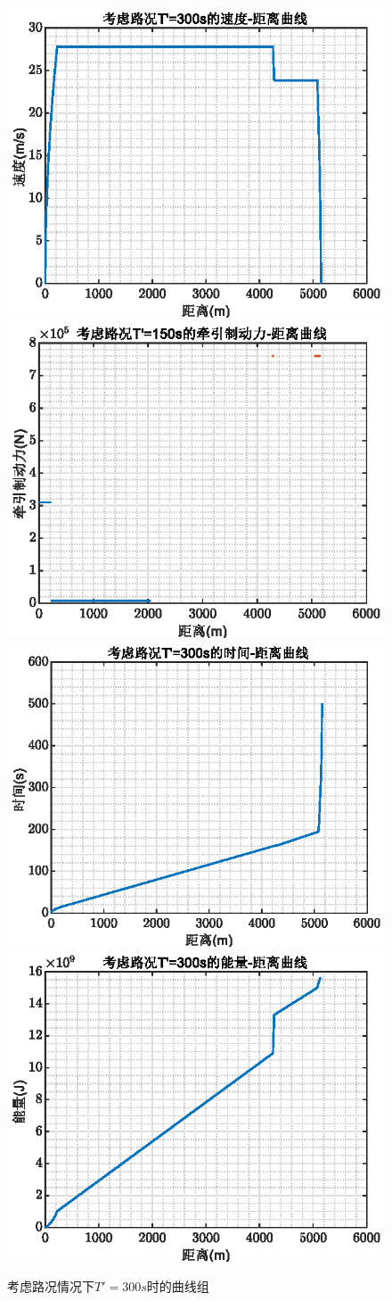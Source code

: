 \documentclass[12pt,a4paper]{nmmcm}
\begin{document}
\begin{figure}[H]
\centering
\includegraphics[width=.49\textwidth,height=0.3\textwidth]{figures/300aa.eps}
\includegraphics[width=.49\textwidth,height=0.3\textwidth]{figures/300bb.eps}
\includegraphics[width=.49\textwidth,height=0.3\textwidth]{figures/300cc.eps}
\includegraphics[width=.49\textwidth,height=0.3\textwidth]{figures/300dd.eps}
\caption{\song\wuhao 考虑路况情况下$T'=300s$时的曲线组}
\end{figure}
\end{document}
